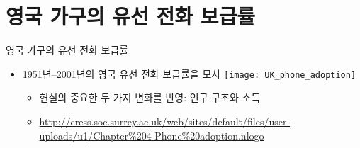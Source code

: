 \documentclass[hyperref={unicode}]{beamer}
\begin{document}
%


\section{영국 가구의 유선 전화 보급률}
\begin{frame}[fragile]{영국 가구의 유선 전화 보급률}
\begin{itemize}
\item 1951년--2001년의 영국 유선 전화 보급률을 모사
	\texttt{[image: UK\_phone\_adoption]}
	\begin{itemize}
	\item 현실의 중요한 두 가지 변화를 반영: 인구 구조와 소득
	\item \url{http://cress.soc.surrey.ac.uk/web/sites/default/files/user-uploads/u1/Chapter%204-Phone%20adoption.nlogo}
	\end{itemize}
\end{itemize}	
\end{frame}
\end{document}
